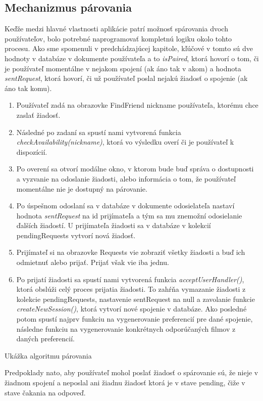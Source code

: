 \subsection{Mechanizmus párovania}
Keďže medzi hlavné vlastnosti aplikácie patrí možnosť spárovania dvoch používateľov, bolo potrebné naprogramovať kompletnú logiku okolo tohto procesu. Ako sme spomenuli v predchádzajúcej kapitole, kľúčové v tomto sú dve hodnoty v databáze v dokumente používateľa a to \textit{isPaired}, ktorá hovorí o tom, či je používateľ momentálne v nejakom spojení (ak áno tak v akom) a hodnota \textit{sentRequest}, ktorá hovorí, či už používateľ poslal nejakú žiadosť o spojenie (ak áno tak komu). 
\begin{algorithm}[H]
\scriptsize
\begin{enumerate}
    \item {Používateľ zadá na obrazovke FindFriend nickname používateľa, ktorému chce zaslať žiadosť.}
    \item {Následné po zadaní sa spustí nami vytvorená funkcia \textit{checkAvailability(nickname)}, ktorá vo výsledku overí či je používateľ k dispozícií.}
    \item {Po overení sa otvorí modálne okno, v ktorom bude buď správa o dostupnosti a vyzvanie na odoslanie žiadosti, alebo informácia o tom, že používateľ momentálne nie je dostupný na párovanie.}
    \item {Po úspešnom odoslaní sa v databáze v dokumente odosielateľa nastaví hodnota \textit{sentRequest} na id prijímateľa a tým sa mu znemožní odosielanie ďalších žiadostí. U prijímateľa žiadosti sa v databáze v kolekcií pendingRequests vytvorí nová žiadosť.}
    \item {Prijímateľ si na obrazovke Requests vie zobraziť všetky žiadosti a buď ich odmietnuť alebo prijať. Prijať však vie iba jednu.}
    \item {Po prijatí žiadosti sa spustí nami vytvorená funkcia \textit{acceptUserHandler()}, ktorá obslúži celý proces prijatia žiadosti. To zahŕňa vymazanie žiadosti z kolekcie pendingRequests, nastavenie sentRequest na null a zavolanie funkcie \textit{createNewSession()}, ktorá vytvorí nové spojenie v databáze. Ako posledné potom spustí najprv funkciu na vygenerovanie preferencií pre dané spojenie, následne funkciu na vygenerovanie konkrétnych odporúčaných filmov z daných preferencií.}
\end{enumerate}
\caption{Ukážka algoritmu párovania}  
\label{alg:preview}  
\end{algorithm}
Predpoklady nato, aby používateľ mohol poslať žiadosť o spárovanie sú, že nieje v žiadnom spojení a neposlal ani žiadnu žiadosť ktorá je v stave pending, čiže v stave čakania na odpoveď. 

